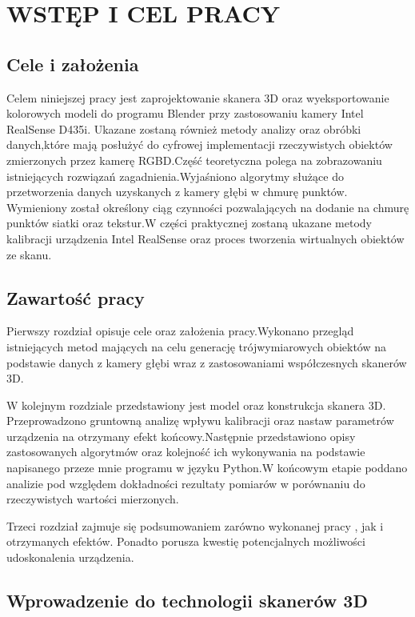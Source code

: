 \documentclass[12pt]{article}
\begin{document}
\section{WSTĘP I CEL PRACY}
\subsection{Cele i założenia}
Celem niniejszej pracy jest zaprojektowanie skanera 3D oraz wyeksportowanie kolorowych modeli do programu Blender przy zastosowaniu kamery Intel RealSense D435i.
Ukazane zostaną również metody analizy oraz obróbki danych,które mają posłużyć do cyfrowej implementacji rzeczywistych obiektów zmierzonych przez kamerę RGBD.Część teoretyczna polega na zobrazowaniu istniejących rozwiązań zagadnienia.Wyjaśniono algorytmy służące do przetworzenia danych uzyskanych z kamery głębi w chmurę punktów. Wymieniony został określony ciąg czynności pozwalających na dodanie na chmurę punktów siatki oraz tekstur.W części praktycznej zostaną ukazane metody kalibracji urządzenia Intel RealSense oraz proces tworzenia wirtualnych obiektów ze skanu.
\subsection{Zawartość pracy}
Pierwszy rozdział opisuje cele oraz założenia pracy.Wykonano przegląd istniejących metod mających na celu generację trójwymiarowych obiektów na podstawie danych z kamery głębi wraz z zastosowaniami współczesnych skanerów 3D.

W kolejnym rozdziale przedstawiony jest model oraz konstrukcja skanera 3D. Przeprowadzono gruntowną analizę wpływu kalibracji oraz nastaw parametrów urządzenia na otrzymany efekt końcowy.Następnie przedstawiono opisy zastosowanych algorytmów oraz kolejność ich wykonywania na podstawie napisanego przeze mnie programu w języku Python.W końcowym etapie poddano analizie pod względem dokładności rezultaty pomiarów w porównaniu do rzeczywistych wartości mierzonych.

Trzeci rozdział zajmuje się podsumowaniem zarówno wykonanej pracy , jak i otrzymanych efektów. Ponadto porusza kwestię potencjalnych możliwości udoskonalenia urządzenia.

\subsection{Wprowadzenie do technologii skanerów 3D}
\end{document}
